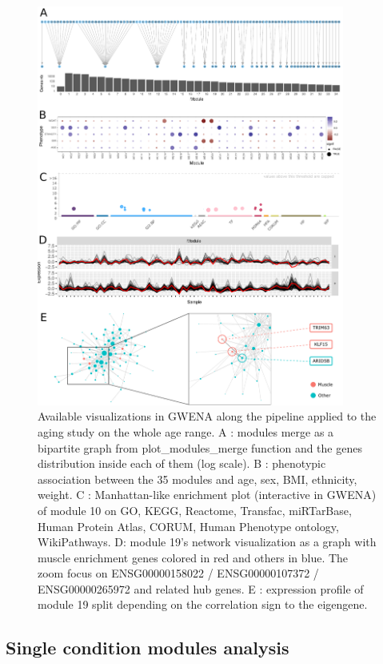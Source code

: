 \begin{figure}[p]
    \centering
    \includegraphics[width=0.90\textwidth]{img/chap1/figure_2.pdf}
    \caption{Available visualizations in GWENA along the pipeline applied to the aging study on the whole age range. A : modules merge as a bipartite graph from plot\_modules\_merge function and the genes distribution inside each of them (log scale). B : phenotypic association between the 35 modules and age, sex, BMI, ethnicity, weight. C : Manhattan-like enrichment plot (interactive in GWENA) of module 10 on GO, KEGG, Reactome, Transfac, miRTarBase, Human Protein Atlas, CORUM, Human Phenotype ontology, WikiPathways. D: module 19's network visualization as a graph with muscle enrichment genes colored in red and others in blue. The zoom focus on ENSG00000158022 / ENSG00000107372 / ENSG00000265972 and related hub genes. E : expression profile of module 19 split depending on the correlation sign to the eigengene.}
    \label{fig:fig_resume_visu}
\end{figure}


\subsection{Single condition modules analysis}

